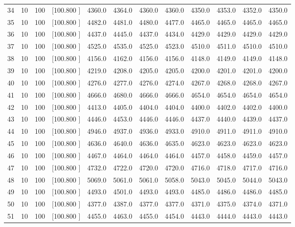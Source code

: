 \documentclass[12pt,a4paper]{article}
\begin{document}
\begin{center}
{\begin{tabular}{r r r r r r r r r r r r}
  34& 10&100&[100.800   ]&  4360.0&  4364.0&  4360.0&  4360.0&  4350.0&  4353.0&  4352.0&  4350.0\\[-0.02in]
  35& 10&100&[100.800   ]&  4482.0&  4481.0&  4480.0&  4477.0&  4465.0&  4465.0&  4465.0&  4465.0\\[-0.02in]
  36& 10&100&[100.800   ]&  4437.0&  4445.0&  4437.0&  4434.0&  4429.0&  4429.0&  4429.0&  4429.0\\[-0.02in]
  37& 10&100&[100.800   ]&  4525.0&  4535.0&  4525.0&  4523.0&  4510.0&  4511.0&  4510.0&  4510.0\\[-0.02in]
  38& 10&100&[100.800   ]&  4156.0&  4162.0&  4156.0&  4156.0&  4148.0&  4149.0&  4149.0&  4148.0\\[-0.02in]
  39& 10&100&[100.800   ]&  4219.0&  4208.0&  4205.0&  4205.0&  4200.0&  4201.0&  4201.0&  4200.0\\[-0.02in]
  40& 10&100&[100.800   ]&  4276.0&  4277.0&  4276.0&  4274.0&  4267.0&  4268.0&  4268.0&  4267.0\\[-0.02in]
  41& 10&100&[100.800   ]&  4666.0&  4680.0&  4666.0&  4666.0&  4654.0&  4654.0&  4654.0&  4654.0\\[-0.02in]
  42& 10&100&[100.800   ]&  4413.0&  4405.0&  4404.0&  4404.0&  4400.0&  4402.0&  4402.0&  4400.0\\[-0.02in]
  43& 10&100&[100.800   ]&  4446.0&  4453.0&  4446.0&  4446.0&  4437.0&  4440.0&  4439.0&  4437.0\\[-0.02in]
  44& 10&100&[100.800   ]&  4946.0&  4937.0&  4936.0&  4933.0&  4910.0&  4911.0&  4911.0&  4910.0\\[-0.02in]
  45& 10&100&[100.800   ]&  4636.0&  4640.0&  4636.0&  4635.0&  4623.0&  4623.0&  4623.0&  4623.0\\[-0.02in]
  46& 10&100&[100.800   ]&  4467.0&  4464.0&  4464.0&  4464.0&  4457.0&  4458.0&  4459.0&  4457.0\\[-0.02in]
  47& 10&100&[100.800   ]&  4732.0&  4722.0&  4720.0&  4720.0&  4716.0&  4718.0&  4717.0&  4716.0\\[-0.02in]
  48& 10&100&[100.800   ]&  5069.0&  5061.0&  5061.0&  5058.0&  5043.0&  5045.0&  5044.0&  5043.0\\[-0.02in]
  49& 10&100&[100.800   ]&  4493.0&  4501.0&  4493.0&  4493.0&  4485.0&  4486.0&  4486.0&  4485.0\\[-0.02in]
  50& 10&100&[100.800   ]&  4377.0&  4387.0&  4377.0&  4377.0&  4371.0&  4375.0&  4374.0&  4371.0\\[-0.02in]
  51& 10&100&[100.800   ]&  4455.0&  4463.0&  4455.0&  4454.0&  4443.0&  4444.0&  4443.0&  4443.0\\[-0.02in]

\end{tabular}}
\end{center}
\end{document}
